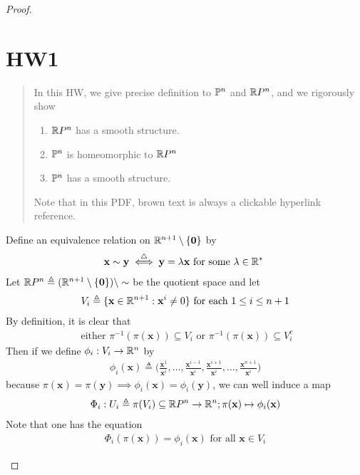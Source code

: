 \documentclass{report}
\begin{document}
\begin{proof}
\section{HW1} 
\begin{abstract}
In this HW, we give precise definition to $\P^n$  and $\RP^n$, and we rigorously show
\begin{enumerate}[label=(\alph*)]
  \item $\RP^n$  has a smooth structure. 
  \item $\P^n$ is homeomorphic to $\RP^n$ 
   \item $\P^n$ has a smooth structure.
\end{enumerate}
Note that in this PDF, brown text is always a clickable hyperlink reference. 
\end{abstract}
\begin{mdframed}
Define an equivalence relation on $\R^{n+1}\setminus \set{\textbf{0}}$ by 
\begin{align*}
\textbf{x}\sim \textbf{y}\overset{\triangle}{\iff }\textbf{y}=\ld \textbf{x}\text{ for some $\ld \inr^*$ } 
\end{align*}
Let $\RP ^n\triangleq (\R^{n+1}\setminus \set{\textbf{0}})\setminus \sim $ be the quotient space and let  
\begin{align*}
V_i\triangleq \set{\textbf{x}\inr^{n+1}:\textbf{x}^i \neq 0}\text{ for each }1\leq i\leq n+1
\end{align*}
By definition, it is clear that 
\begin{align*}
\text{ either }\pi^{-1}(\pi (\textbf{x}))\subseteq V_i\text{ or }\pi^{-1}(\pi (\textbf{x}))\subseteq V_i^c
\end{align*}
Then if we define $\phi_i:V_i\rightarrow \R^n$ by
\begin{align*}
\phi_i(\textbf{x})\triangleq \Big(\frac{\textbf{x}^1}{\textbf{x}^i},\dots ,\frac{\textbf{x}^{i-1}}{\textbf{x}^i},\frac{\textbf{x}^{i+1}}{\textbf{x}^i},\dots,\frac{\textbf{x}^{n+1}}{\textbf{x}^i} \Big)
\end{align*}
because $\pi (\textbf{x})=\pi(\textbf{y})\implies \phi_i(\textbf{x})=\phi_i(\textbf{y})$, we can well induce a map 
\begin{align*}
\Phi_i:U_i\triangleq \pi (V_i)\subseteq \R P^n\rightarrow \R^n; \pi (\textbf{x})\mapsto \phi_i(\textbf{x})
\end{align*}
Note that one has the equation 
\begin{align*}
\Phi_i(\pi (\textbf{x}))= \phi_i(\textbf{x})\text{ for all }\textbf{x}\in V_i
\end{align*}

\end{mdframed}
\end{proof}
\end{document}
